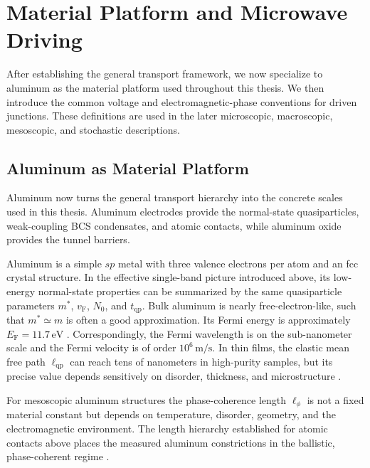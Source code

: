 
\section{Material Platform and Microwave Driving}
\label{sec:platform}

    After establishing the general transport framework, we now specialize to aluminum as the material platform used throughout this thesis. We then introduce the common voltage and electromagnetic-phase conventions for driven junctions. These definitions are used in the later microscopic, macroscopic, mesoscopic, and stochastic descriptions.

    \subsection{Aluminum as Material Platform}
    \label{subsec:platform:aluminum}

        Aluminum now turns the general transport hierarchy into the concrete scales used in this thesis. Aluminum electrodes provide the normal-state quasiparticles, weak-coupling BCS condensates, and atomic contacts, while aluminum oxide provides the tunnel barriers.

        Aluminum is a simple $sp$ metal with three valence electrons per atom and an fcc crystal structure. In the effective single-band picture introduced above, its low-energy normal-state properties can be summarized by the same quasiparticle parameters $m^\ast$, $v_\mathrm{F}$, $N_0$, and $t_\mathrm{qp}$. Bulk aluminum is nearly free-electron-like, such that $m^\ast \simeq m$ is often a good approximation. Its Fermi energy is approximately $E_\mathrm{F} = 11.7\,\mathrm{eV}$ \cite{chauvin_josephson_2005}. Correspondingly, the Fermi wavelength is on the sub-nanometer scale and the Fermi velocity is of order $10^6\,\mathrm{m/s}$. In thin films, the elastic mean free path $\ell_\mathrm{qp}$ can reach tens of nanometers in high-purity samples, but its precise value depends sensitively on disorder, thickness, and microstructure \cite{steinberg_quasi-particle_2008}.

        For mesoscopic aluminum structures the phase-coherence length $\ell_\phi$ is not a fixed material constant but depends on temperature, disorder, geometry, and the electromagnetic environment. The length hierarchy established for atomic contacts above places the measured aluminum constrictions in the ballistic, phase-coherent regime \cite{scheer_conduction_1997, agrait_quantum_2003}.

